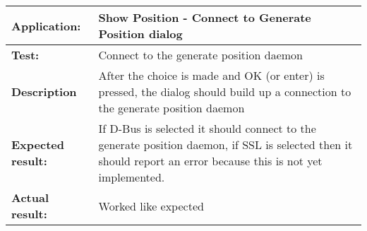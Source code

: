    \begin{tabular}{|p{3.5cm}|p{10.5cm}|}
    \hline
     \textbf{Application:}	& Show Position - Connect to Generate Position dialog\\
    \hline
     \textbf{Test:}		& Connect to the generate position daemon\\
    \hline
     \textbf{Description}	& After the choice is made and OK (or enter) is pressed, the dialog should build up a connection to the generate position daemon\\
    \hline
     \textbf{Expected result:}	& If D-Bus is selected it should connect to the generate position daemon, if SSL is selected then it should report an error because this is not yet implemented.\\
    \hline
     \textbf{Actual result:}	& Worked like expected\\
    \hline
   \end{tabular}

